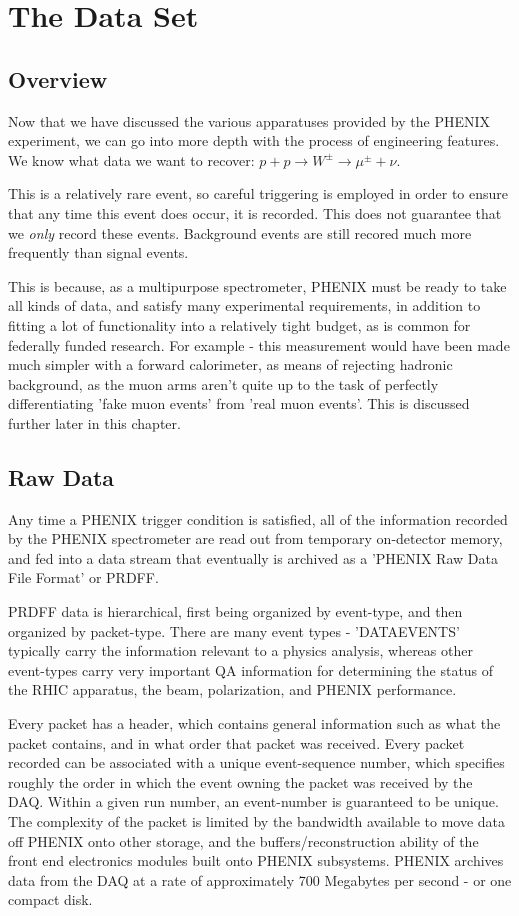 \chapter{The Data Set}
\label{ch:data_collection}
\section{Overview}
Now that we have discussed the various apparatuses provided by the PHENIX
experiment, we can go into more depth with the process of engineering features.
We know what data we want to recover: $p + p \rightarrow W^\pm \rightarrow
\mu^\pm + \nu$.

This is a relatively rare event, so careful triggering is employed in order to
ensure that any time this event does occur, it is recorded. This does not
guarantee that we \textit{only} record these events. Background events are still
recored much more frequently than signal events.

This is because, as a multipurpose spectrometer, PHENIX must be ready to take
all kinds of data, and satisfy many experimental requirements, in addition to
fitting a lot of functionality into a relatively tight budget, as is common for
federally funded research. For example - this measurement would have been made
much simpler with a forward calorimeter, as  means of rejecting hadronic
background, as the muon arms aren't quite up to the task of perfectly
differentiating 'fake muon events' from 'real muon events'. This is discussed
further later in this chapter.

\section{Raw Data}

Any time a PHENIX trigger condition is satisfied, all of the information
recorded by the PHENIX spectrometer are read out from temporary on-detector
memory, and fed into a data stream that eventually is archived as a 'PHENIX Raw
Data File Format' or PRDFF. 

PRDFF data is hierarchical, first being organized by event-type, and
then organized by packet-type.  There are many event types - 'DATAEVENTS'
typically carry the information relevant to a physics analysis, whereas other
event-types carry very important QA information for determining the status of
the RHIC apparatus, the beam, polarization, and PHENIX performance.

Every packet has a header, which contains general information such as what the
packet contains, and in what order that packet was received. Every packet
recorded can be associated with a unique event-sequence number, which specifies
roughly the order in which the event owning the packet was received by the DAQ.
Within a given run number, an event-number is guaranteed to be unique. The
complexity of the packet is limited by the bandwidth available to move data off
PHENIX onto other storage, and the buffers/reconstruction ability of the front
end electronics modules built onto PHENIX subsystems. PHENIX archives data from
the DAQ at a rate of approximately 700 Megabytes per second - or one compact
disk.

